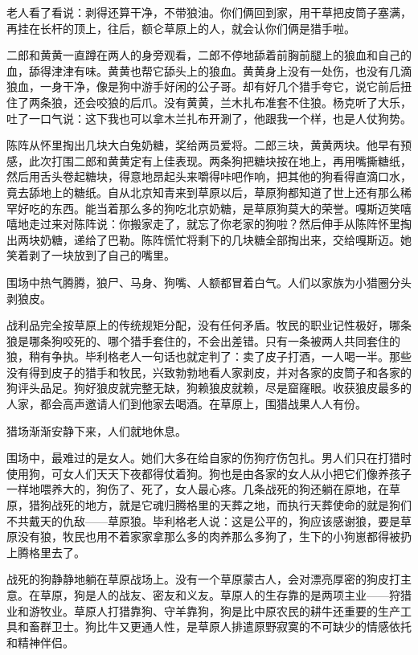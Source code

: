 \par 老人看了看说：剥得还算干净，不带狼油。你们俩回到家，用干草把皮筒子塞满，再挂在长杆的顶上，往后，额仑草原上的人，就会认你们俩是猎手啦。
\par 二郎和黄黄一直蹲在两人的身旁观看，二郎不停地舔着前胸前腿上的狼血和自己的血，舔得津津有味。黄黄也帮它舔头上的狼血。黄黄身上没有一处伤，也没有几滴狼血，一身干净，像是狗中游手好闲的公子哥。却有好几个猎手夸它，说它前后扭住了两条狼，还会咬狼的后爪。没有黄黄，兰木扎布准套不住狼。杨克听了大乐，吐了一口气说：这下我也可以拿木兰扎布开涮了，他跟我一个样，也是人仗狗势。
\par 陈阵从怀里掏出几块大白兔奶糖，奖给两员爱将。二郎三块，黄黄两块。他早有预感，此次打围二郎和黄黄定有上佳表现。两条狗把糖块按在地上，再用嘴撕糖纸，然后用舌头卷起糖块，得意地昂起头来嚼得咔吧作响，把其他的狗看得直滴口水，竟去舔地上的糖纸。自从北京知青来到草原以后，草原狗都知道了世上还有那么稀罕好吃的东西。能当着那么多的狗吃北京奶糖，是草原狗莫大的荣誉。嘎斯迈笑嘻嘻地走过来对陈阵说：你搬家走了，就忘了你老家的狗啦？然后伸手从陈阵怀里掏出两块奶糖，递给了巴勒。陈阵慌忙将剩下的几块糖全部掏出来，交给嘎斯迈。她笑着剥了一块放到了自己的嘴里。
\par 围场中热气腾腾，狼尸、马身、狗嘴、人额都冒着白气。人们以家族为小猎圈分头剥狼皮。
\par 战利品完全按草原上的传统规矩分配，没有任何矛盾。牧民的职业记性极好，哪条狼是哪条狗咬死的、哪个猎手套住的，不会出差错。只有一条被两人共同套住的狼，稍有争执。毕利格老人一句话也就定判了：卖了皮子打酒，一人喝一半。那些没有得到皮子的猎手和牧民，兴致勃勃地看人家剥皮，并对各家的皮筒子和各家的狗评头品足。狗好狼皮就完整无缺，狗赖狼皮就赖，尽是窟窿眼。收获狼皮最多的人家，都会高声邀请人们到他家去喝酒。在草原上，围猎战果人人有份。
\par 
\par 猎场渐渐安静下来，人们就地休息。
\par 围场中，最难过的是女人。她们大多在给自家的伤狗疗伤包扎。男人们只在打猎时使用狗，可女人们天天下夜都得仗着狗。狗也是由各家的女人从小把它们像养孩子一样地喂养大的，狗伤了、死了，女人最心疼。几条战死的狗还躺在原地，在草原，猎狗战死的地方，就是它魂归腾格里的天葬之地，而执行天葬使命的就是狗们不共戴天的仇敌——草原狼。毕利格老人说：这是公平的，狗应该感谢狼，要是草原没有狼，牧民也用不着家家拿那么多的肉养那么多狗了，生下的小狗崽都得被扔上腾格里去了。
\par 战死的狗静静地躺在草原战场上。没有一个草原蒙古人，会对漂亮厚密的狗皮打主意。在草原，狗是人的战友、密友和义友。草原人的生存靠的是两项主业——狩猎业和游牧业。草原人打猎靠狗、守羊靠狗，狗是比中原农民的耕牛还重要的生产工具和畜群卫士。狗比牛又更通人性，是草原人排遣原野寂寞的不可缺少的情感依托和精神伴侣。
